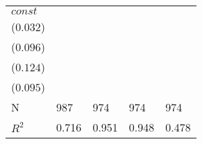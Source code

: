 \begin{tabular}{lllll}
$const$                    &   \makecell{$0.126^{***}$ \\ ($0.032$)} &    \makecell{$-0.003^{}$ \\ ($0.096$)} &     \makecell{$0.025^{}$ \\ ($0.124$)} &     \makecell{$0.240^{**}$ \\ ($0.095$)} \\
\midrule N                 &                                     987 &                                    974 &                                    974 &                                      974 \\
$R^2$                      &                                   0.716 &                                  0.951 &                                  0.948 &                                    0.478 \\
\bottomrule
\end{tabular}
